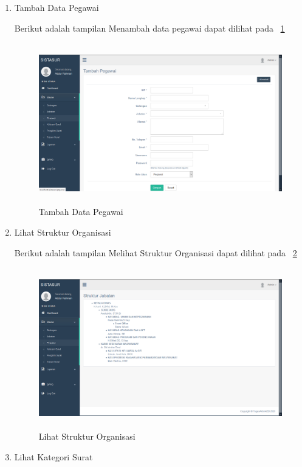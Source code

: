\begin{enumerate}
\begin{enumerate}
		\item Tambah Data Pegawai
		
		Berikut adalah tampilan Menambah data pegawai dapat dilihat pada \pic~\ref{TambahDataPegawai}
		
		\begin{figure}
			\centering
			\includegraphics [height= 7cm, width=11cm]{konten/gambar/UISistemSurat/Admin/6.TambahDataPegawai.png}
			\caption{Tambah Data Pegawai}
			\label{TambahDataPegawai}
		\end{figure}
		
		\item Lihat Struktur Organisasi
		
		Berikut adalah tampilan Melihat Struktur Organisasi dapat dilihat pada \pic~\ref{LihatStrukturOrganisasi}
		
		\begin{figure}
			\centering
			\includegraphics [height= 7cm, width=11cm]{konten/gambar/UISistemSurat/Admin/7.LihatStrukturOrganisasi.png}
			\caption{Lihat Struktur Organisasi}
			\label{LihatStrukturOrganisasi}
		\end{figure}
		
		\item Lihat Kategori Surat
		

\end{enumerate}
\end{enumerate}
